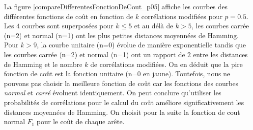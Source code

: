\documentclass[onecolumn, 12pt]{book}
\begin{document}
La figure \ref{compareDifferentesFonctionDeCout_p05} affiche les courbes des diff\'erentes fonctions de co\^ut en fonction de $k$ corr\'elations modifi\'ees pour $p = 0.5$.
\newline
Les $4$ courbes sont superpos\'ees pour $k\le5$ et au d\'el\`a de $k>5$, les courbes carr\'ee (n=2) et normal (n=1) ont les plus petites distances moyenn\'ees de Hamming.
Pour $k>9$, la courbe unitaire (n=0) \'evolue de mani\`ere exponentielle tandis que les courbes carr\'ee (n=2) et normal (n=1) ont un rapport de $2$ entre les distances de Hamming et le nombre $k$ de corr\'elations modifi\'ees.
On en d\'eduit que la pire fonction de co\^ut est la fonction unitaire (n=0 en jaune).
\newline
Toutefois, nous ne pouvons pas choisir la meilleure fonction de co\^ut car les fonctions des courbes {\em normal} et {\em carr\'e} \'evoluent identiquement.
 On peut conclure qu'utiliser les probabilit\'es de corr\'elations pour le calcul du co\^ut am\'eliore significativement les distances moyenn\'ees de Hamming.
 \newline
 On choisit pour la suite la fonction de cout normal $F_1$ pour le co\^ut de chaque ar\^ete. 
\end{document}
